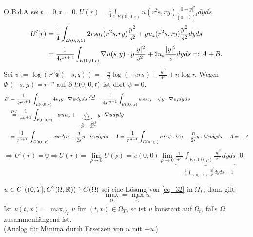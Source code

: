 	O.B.d.A sei $t=0, x=0$. $U(r) = \frac{1}{4} \int_{E(0,0,r)} u(r^2 \tilde{s},r \tilde{y}) \frac{|0- \tilde{y|^2}}{(0-\tilde{s})^2} d\tilde{y} d\tilde{s}$. \\
	\begin{equation}
	\begin{aligned}
	U'(r) &= \frac{1}{4} \int_{E(0,0,1)} 2rs u_t(r^2 s,ry) \frac{y^2}{s^2} + yu_x(r^2s,ry) \frac{y^2}{s^2} dyds \\ \notag 
	&= \frac{1}{4r^{n+1}} \int_{E(0,0,r)} \nabla u(s,y) \cdot y \frac{|y|^2}{s^2} + 2u_s \frac{|y|^2}{s} dyds =: A+B.
	\end{aligned}
	\end{equation}
	Sei $\psi := \log(r^n \Phi(-s,y)) = -\frac{n}{2} \log (-urs) + \frac{|y|^2}{4^s} + n \log r$. Wegen $\Phi(-s,y) = r^{-n}$ auf $\operatorname{\partial} E(0,0,r)$ ist dort $\psi = 0$.
	\begin{equation}
	\begin{aligned}
		B &= \frac{1}{4r^{n+1}} \int_{E(0,0,r)} 4u_s y \cdot \nabla \psi dy ds \overset{P.I.}{=} -\frac{1}{4r^{n+1}} \int_{E(0,0,r)} \psi n u_s + \psi y \cdot \nabla u_s dy ds \\ \notag
		&\overset{P.I.}{=} \frac{1}{r^{n+1}} \int_{E(0,0,r)} -\psi n u_s + \underbrace{\psi_s}_{-\frac{n}{2s} - \frac{|y|^2}{4s^2}} y \cdot \nabla u dy dy \\
		&= \frac{1}{r^{n+1}} \int_{E(0,0,r)} -\psi n \Delta u - \frac{n}{2s} y \cdot \nabla u dy ds - A = \frac{1}{r^{n+1}} \int_{E(0,0,1)} n \nabla \psi \cdot \nabla u - \frac{n}{2s} y \cdot \nabla u dy ds -A = -A
	\end{aligned}
	\end{equation}
	$\Rightarrow U'(r) = 0 \Rightarrow U(r) = \lim\limits_{\rho \rightarrow 0} U(\rho) = u(0,0) \lim\limits_{\rho \rightarrow 0} \underbrace{\frac{1}{4\rho^n} \int_{E(0,0,\rho)} \frac{|y|^2}{s^2} dyds}_{=\frac{1}{4} \int_{E(0,0,1)} \frac{|y|^2}{s^2} dyds = 1}$ \qed

\begin{thm} \label{thm_86}
	$u \in C^1((0,T];C^2(\Omega,\mathbb{R})) \cap C(\Omega)$ sei eine Lösung von \eqref{eq_32} in $\Omega_T$, dann gilt: \marginnote{[86]}
	\[ \max_{\overline{\Omega_T}} = \max_{\Gamma_T} u \]
	Ist $u(t,x) = \max_{\overline{\Omega_T}} u$ für $(t,x) \in \Omega_T$, so ist $u$ konstant auf $\Omega_t$, falls $\Omega$ zusammenhängend ist. \\
	(Analog für Minima durch Ersetzen von $u$ mit $-u$.)
\end{thm}

